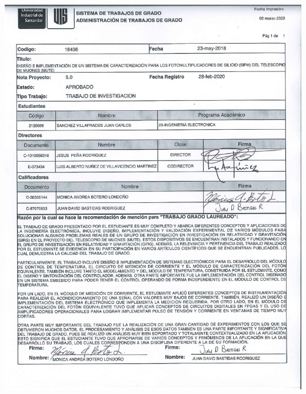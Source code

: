 
 \newpage
 \begin{center}
 \includegraphics[trim = 5mm 10mm 5mm 1mm, scale=0.5, clip,width=\textwidth]{Images/nota}%
 \par
 \end{center}

